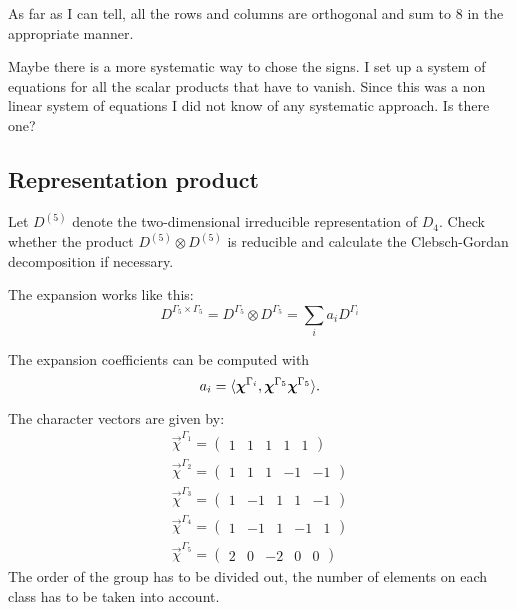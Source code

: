\documentclass[11pt, english, fleqn, DIV=15, headinclude, BCOR=1cm]{scrartcl}
\begin{document}
As far as I can tell, all the rows and columns are orthogonal and sum to 8 in
the appropriate manner.

\begin{question}
    Maybe there is a more systematic way to chose the signs. I set up a system
    of equations for all the scalar products that have to vanish. Since this
    was a non linear system of equations I did not know of any systematic
    approach. Is there one?
\end{question}

\subsection{Representation product}

\begin{problem}
    Let $D^{(5)}$ denote the two-dimensional irreducible representation of
    $D_4$. Check whether the product $D^{(5)} \otimes D^{(5)}$ is reducible and
    calculate the Clebsch-Gordan decomposition if necessary.
\end{problem}

The expansion works like this:
\[
    D^{\Gamma_5 \times \Gamma_5}
    = D^{\Gamma_5} \otimes D^{\Gamma_5}
    = \sum_i a_i D^{\Gamma_i} 
\]

The expansion coefficients can be computed with
\[
    a_i = \langle \boldsymbol{\chi}^{\Gamma_i}, \boldsymbol{\chi}^{\Gamma_5} \boldsymbol{\chi}^{\Gamma_5} \rangle.
\]

The character vectors are given by:
\begin{gather*}
    \vec\chi^{\Gamma_1} = \begin{pmatrix} 1 & 1 & 1 & 1 & 1 \end{pmatrix} \\
    \vec\chi^{\Gamma_2} = \begin{pmatrix} 1 & 1 & 1 & -1 & -1 \end{pmatrix} \\
    \vec\chi^{\Gamma_3} = \begin{pmatrix} 1 & -1 & 1 & 1 & -1 \end{pmatrix} \\
    \vec\chi^{\Gamma_4} = \begin{pmatrix} 1 & -1 & 1 & -1 & 1 \end{pmatrix} \\
    \vec\chi^{\Gamma_5} = \begin{pmatrix} 2 & 0 & -2 & 0 & 0 \end{pmatrix}
\end{gather*}
The order of the group has to be divided out, the number of elements on each
class has to be taken into account.
\end{document}
